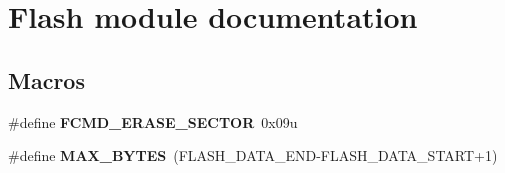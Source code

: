 \hypertarget{group___flash__module}{}\section{Flash module documentation}
\label{group___flash__module}
\subsection*{Macros}
\begin{DoxyCompactItemize}
\item 
\hypertarget{group___flash__module_ga615c0e52a86220f1a48211194d094ae3}{}\#define {\bfseries F\+C\+M\+D\+\_\+\+E\+R\+A\+S\+E\+\_\+\+S\+E\+C\+T\+O\+R}~0x09u\label{group___flash__module_ga615c0e52a86220f1a48211194d094ae3}

\item 
\hypertarget{group___flash__module_gaabb27f74e9a532512f75b57584b5d420}{}\#define {\bfseries M\+A\+X\+\_\+\+B\+Y\+T\+E\+S}~(F\+L\+A\+S\+H\+\_\+\+D\+A\+T\+A\+\_\+\+E\+N\+D-\/F\+L\+A\+S\+H\+\_\+\+D\+A\+T\+A\+\_\+\+S\+T\+A\+R\+T+1)\label{group___flash__module_gaabb27f74e9a532512f75b57584b5d420}

\end{DoxyCompactItemize}
